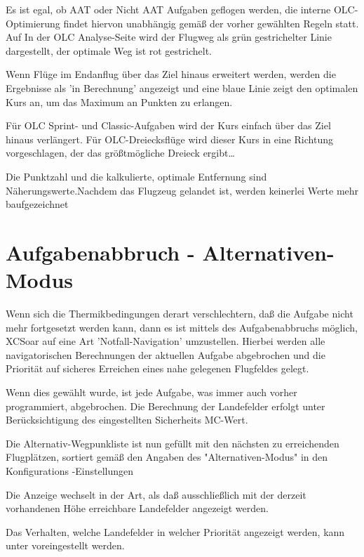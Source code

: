Es ist egal, ob AAT oder Nicht AAT Aufgaben geflogen werden, die interne OLC-Optimierung findet hiervon unabhängig gemäß der vorher gewählten Regeln statt.  Auf In der OLC Analyse-Seite wird der Flugweg als grün gestrichelter Linie dargestellt, der optimale Weg ist rot gestrichelt.

Wenn Flüge im Endanflug über das Ziel hinaus erweitert werden, werden die Ergebnisse als 'in Berechnung' angezeigt und eine blaue Linie zeigt den optimalen Kurs an, um das Maximum an Punkten zu erlangen.

Für OLC Sprint- und Classic-Aufgaben wird der Kurs einfach über das Ziel hinaus verlängert.  Für OLC-Dreiecksflüge wird dieser Kurs in eine Richtung vorgeschlagen, der das größtmögliche Dreieck ergibt\dots

Die Punktzahl und die kalkulierte, optimale Entfernung sind Näherungswerte.Nachdem das Flugzeug gelandet ist, werden keinerlei Werte mehr baufgezeichnet

\section{Aufgabenabbruch - Alternativen-Modus}\label{sec:taskabort}

Wenn sich die Thermikbedingungen derart verschlechtern, daß die Aufgabe nicht mehr fortgesetzt werden kann,
dann es ist mittels des Aufgabenabbruchs möglich, \textsf{XCSoar} auf eine Art 'Notfall-Navigation' umzustellen.
Hierbei werden alle navigatorischen Berechnungen der aktuellen Aufgabe abgebrochen und die Priorität auf sicheres Erreichen eines nahe gelegenen Flugfeldes gelegt.

Wenn dies gewählt wurde,  ist jede Aufgabe, was immer auch vorher programmiert, abgebrochen.
Die Berechnung der Landefelder erfolgt unter Berücksichtigung des eingestellten Sicherheits MC-Wert.

 Die Alternativ-Wegpunkliste ist nun gefüllt mit den nächsten zu erreichenden Flugplätzen, sortiert gemäß den Angaben des  "Alternativen-Modus" in den Konfigurations -Einstellungen

Die Anzeige wechselt in der Art, als daß ausschließlich mit  der derzeit vorhandenen Höhe erreichbare
Landefelder angezeigt werden.

Das Verhalten, welche Landefelder in welcher Priorität angezeigt werden, kann  unter  voreingestellt werden.


